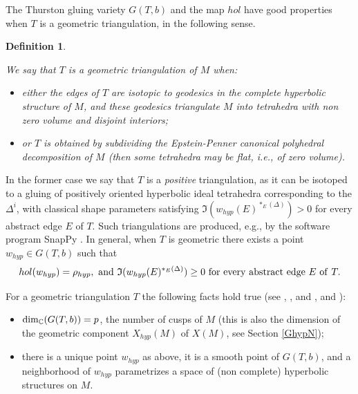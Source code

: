 \documentclass[11pt]{amsart}
\newtheorem{defi}[teo]{Definition}
\newcommand{\mc}{\mathbb{C}}
\begin{document}
The Thurston gluing variety $G(T,b)$ and the map $hol$ have good properties when $T$ is a geometric triangulation, in the following sense.
\begin{defi}\label{defgeomtri}{\rm We say that $T$ is a {\it geometric triangulation} of $M$ when:
\begin{itemize}
\item either the edges of $T$ are isotopic to geodesics in the complete hyperbolic structure of $M$, and these geodesics triangulate $M$ into tetrahedra with non zero volume and disjoint interiors; 
\item or $T$ is obtained by subdividing the Epstein-Penner canonical polyhedral decomposition of $M$ (then some tetrahedra may be flat, {\it i.e.}, of zero volume).
\end{itemize}}
\end{defi}
In the former case we say that $T$ is a {\it positive} triangulation, as it can be isotoped to a gluing of positively oriented hyperbolic ideal tetrahedra corresponding to the $\Delta^i$, with classical shape parameters satisfying $\mathfrak{I}(w_{hyp}(E)^{*_E(\Delta)})> 0$ for every abstract edge $E$ of $T$. Such triangulations are produced, e.g., by the software program SnapPy \cite{CDGW}. In general, when $T$ is geometric there exists a point $w_{hyp}\in G(T,b)$ such that $$hol(w_{hyp}) = \rho_{hyp}, \ {\rm and\ } \mathfrak{I}(w_{hyp}(E)^{*_E(\Delta)})\geq 0 \ {\rm for\ every\ abstract\ edge\ }E \ {\rm of\ } T.$$ 

For a geometric triangulation $T$ the following facts hold true  (see \cite{NZ},  \cite[Chapter E.6 and Proposition 7.7]{BP}, \cite{PW} and \cite[Proposition 3.5-3.6]{PP},  \cite{Choi} and \cite[Proposition 15.3.4]{Martelli}):
\begin{itemize}
\item[(i)] ${\rm dim}_\mc(G(T,b))=p$, the number of cusps of $M$ (this is also the dimension of the geometric component $X_{hyp}(M)$ of $X(M)$, see Section \ref{GhypN});
\item[(ii)] there is a unique point $w_{hyp}$ as above, it is a smooth point of $G(T,b)$, and a neighborhood of $w_{hyp}$ parametrizes a space of (non complete) hyperbolic structures on $M$.
 \end{itemize} 
\end{document}
